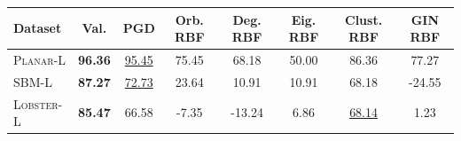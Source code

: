 \begin{tabular}{lccccccc}
\toprule
\textbf{Dataset} & \textbf{Val.} & \textbf{PGD} & \textbf{Orb. RBF} & \textbf{Deg. RBF} & \textbf{Eig. RBF} & \textbf{Clust. RBF} & \textbf{GIN RBF} \\
\midrule
\textsc{Planar-L} & \textbf{96.36} & \underline{95.45} & 75.45 & 68.18 & 50.00 & 86.36 & 77.27 \\
\textsc{SBM-L} & \textbf{87.27} & \underline{72.73} & 23.64 & 10.91 & 10.91 & 68.18 & -24.55 \\
\textsc{Lobster-L} & \textbf{85.47} & 66.58 & -7.35 & -13.24 & 6.86 & \underline{68.14} & 1.23 \\
\bottomrule
\end{tabular}